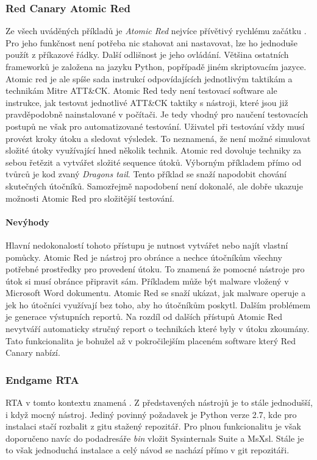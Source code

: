 \subsubsection{Red Canary Atomic Red}
Ze všech uváděných příkladů je \textit{Atomic Red} nejvíce přívětivý rychlému začátku .
Pro jeho funkčnost není potřeba nic stahovat ani nastavovat, lze ho jednoduše použít z příkazové řádky\cite{redcanary_atomic_red}.
Další odlišnost je jeho ovládání.
Většina ostatních frameworků je založena na jazyku Python, popřípadě jiném skriptovacím jazyce.
Atomic red je ale spíše sada instrukcí odpovídajících jednotlivým taktikám a technikám Mitre ATT\&CK\@.
Atomic Red tedy není testovací software ale instrukce, jak testovat jednotlivé ATT\&CK taktiky s nástroji, které jsou již pravděpodobně nainstalované v počítači.
Je tedy vhodný pro naučení testovacích postupů ne však pro automatizované testování.
Uživatel při testování vždy musí provézt kroky útoku a sledovat výsledek.
To neznamená, že není možné simulovat složité útoky využívající hned několik technik.
Atomic red dovoluje techniky za sebou řetězit a vytvářet složité sequence útoků.
Výborným příkladem přímo od tvůrců je kod zvaný \textit{Dragons tail}\cite{redcanary_dragons_tail}.
Tento příklad se snaží napodobit chování skutečných útočníků.
Samozřejmě napodobení není dokonalé, ale dobře ukazuje možnosti Atomic Red pro složitější testování.\cite{csoonline_4_testing_frameworks}

\paragraph{Nevýhody}
Hlavní nedokonalostí tohoto přístupu je nutnost vytvářet nebo najít vlastní pomůcky.
Atomic Red je nástroj pro obránce a nechce útočníkům všechny potřebné prostředky pro provedení útoku.
To znamená že pomocné nástroje pro útok si musí obránce připravit sám.
Příkladem může být malware vložený v Microsoft Word dokumentu.
Atomic Red se snaží ukázat, jak malware operuje a jek ho útočníci využívají bez toho, aby ho útočníkům poskytl.
Dalším problémem je generace výstupních reportů.
Na rozdíl od dalších přístupů Atomic Red nevytváří automaticky stručný report o technikách které byly v útoku zkoumány.
Tato funkcionalita je bohužel až v pokročilejším placeném software který Red Canary nabízí.\cite{csoonline_4_testing_frameworks}


\subsubsection{Endgame RTA}
\ac{RTA} v tomto kontextu znamená .
Z představených nástrojů je to stále jednodušší, i když mocný nástroj.
Jediný povinný požadavek je Python verze 2.7, kde pro instalaci stačí rozbalit z gitu stažený repozitář.
Pro plnou funkcionalitu je však doporučeno navíc do podadresáře \textit{bin} vložit Sysinternals Suite a MsXsl.
Stále je to však jednoduchá instalace a celý návod se nachází přímo v git repozitáři.\cite{endgame_rta}

